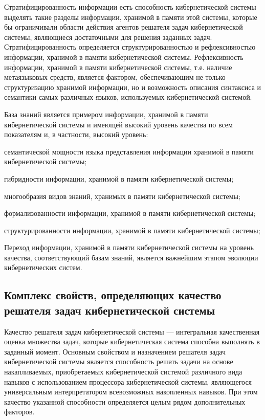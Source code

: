 Стратифицированность информации есть способность кибернетической системы выделять такие разделы информации, хранимой в памяти этой системы, которые бы ограничивали области действия агентов решателя задач кибернетической системы, являющиеся достаточными для решения заданных задач.
Стратифицированность определяется структурированностью и рефлексивностью информации, хранимой в памяти кибернетической системы.
Рефлексивность информации, хранимой в памяти кибернетической системы, т.е. наличие метаязыковых средств, является фактором, обеспечивающим не только структуризацию хранимой информации, но и возможность описания синтаксиса и семантики самых различных языков, используемых кибернетической системой.

База знаний является примером информации, хранимой в памяти кибернетической системы и имеющей высокий уровень качества по всем показателям и, в частности, высокий уровень:
\begin{textitemize}
    \item семантической мощности языка представления информации хранимой в памяти кибернетической
системы;
    \item гибридности информации, хранимой в памяти кибернетической системы;
    \item многообразия видов знаний, хранимых в памяти кибернетической системы;
    \item формализованности информации, хранимой в памяти кибернетической системы;
    \item структурированности информации, хранимой в памяти кибернетической системы;
\end{textitemize}

Переход информации, хранимой в памяти кибернетической системы на уровень качества, соответствующий базам знаний, является важнейшим этапом эволюции кибернетических систем.


\subsection{Комплекс свойств, определяющих качество решателя задач кибернетической системы}
{\label{sec_cyb_syst_problem_solver_quality}} 

Качество решателя задач кибернетической системы --- интегральная качественная оценка множества задач, которые кибернетическая система способна выполнять в заданный момент.
Основным свойством и назначением решателя задач кибернетической системы является способность решать задачи на основе накапливаемых, приобретаемых кибернетической системой различного вида навыков с использованием процессора кибернетической системы, являющегося универсальным интерпретатором всевозможных накопленных навыков. 
При этом качество указанной способности определяется целым рядом дополнительных факторов.


